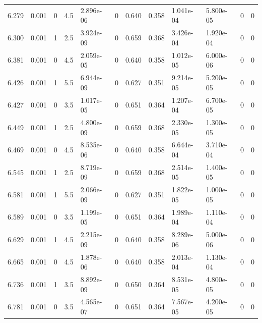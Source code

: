\documentclass[preview]{standalone}
\begin{document}
{{{\begin{tabular}{L{1.2cm}C{1.2cm} C{0.3cm}C{0.5cm} C{1.4cm}C{1.4cm} C{1.4cm}C{1.4cm} C{1.6cm}C{1.6cm} C{1.6cm}C{1.6cm}}
  6.279  &  0.001  & 0     & 4.5 &  2.896e-06  & 0  &  0.640&   0.358& 1.041e-04 & 5.800e-05   &  0 & 0  \\ 
  6.300  &  0.001  & 1     & 2.5 &  3.924e-09  & 0  &  0.659&   0.368& 3.426e-04 & 1.920e-04   &  0 & 0  \\ 
  6.381  &  0.001  & 0     & 4.5 &  2.059e-05  & 0  &  0.640&   0.358& 1.012e-05 & 6.000e-06   &  0 & 0  \\ 
  6.426  &  0.001  & 1     & 5.5 &  6.944e-09  & 0  &  0.627&   0.351& 9.214e-05 & 5.200e-05   &  0 & 0  \\ 
  6.427  &  0.001  & 0     & 3.5 &  1.017e-05  & 0  &  0.651&   0.364& 1.207e-04 & 6.700e-05   &  0 & 0  \\ 
  6.449  &  0.001  & 1     & 2.5 &  4.800e-09  & 0  &  0.659&   0.368& 2.330e-05 & 1.300e-05   &  0 & 0  \\ 
  6.469  &  0.001  & 0     & 4.5 &  8.535e-06  & 0  &  0.640&   0.358& 6.644e-04 & 3.710e-04   &  0 & 0  \\ 
  6.545  &  0.001  & 1     & 2.5 &  8.719e-09  & 0  &  0.659&   0.368& 2.514e-05 & 1.400e-05   &  0 & 0  \\ 
  6.581  &  0.001  & 1     & 5.5 &  2.066e-09  & 0  &  0.627&   0.351& 1.822e-05 & 1.000e-05   &  0 & 0  \\ 
  6.589  &  0.001  & 0     & 3.5 &  1.199e-05  & 0  &  0.651&   0.364& 1.989e-04 & 1.110e-04   &  0 & 0  \\ 
  6.629  &  0.001  & 1     & 4.5 &  2.215e-09  & 0  &  0.640&   0.358& 8.289e-06 & 5.000e-06   &  0 & 0  \\ 
  6.665  &  0.001  & 0     & 4.5 &  1.878e-06  & 0  &  0.640&   0.358& 2.013e-04 & 1.130e-04   &  0 & 0  \\ 
  6.736  &  0.001  & 1     & 3.5 &  8.892e-09  & 0  &  0.650&   0.364& 8.531e-05 & 4.800e-05   &  0 & 0  \\ 
  6.781  &  0.001  & 0     & 3.5 &  4.565e-07  & 0  &  0.651&   0.364& 7.567e-05 & 4.200e-05   &  0 & 0  \\ 
\hline 
\end{tabular} 

}}}
\end{document}
